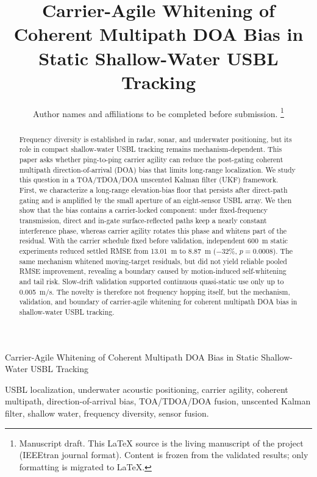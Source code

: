 \documentclass[journal]{IEEEtran}
\begin{document}
\title{Carrier-Agile Whitening of Coherent Multipath DOA Bias in Static Shallow-Water USBL Tracking}

\author{Author names and affiliations to be completed before submission.%
\thanks{Manuscript draft. This LaTeX source is the living manuscript of the project
(IEEEtran journal format). Content is frozen from the validated results; only formatting
is migrated to LaTeX.}}

%
{Carrier-Agile Whitening of Coherent Multipath DOA Bias in Static Shallow-Water USBL Tracking}

\maketitle

\begin{abstract}
Frequency diversity is established in radar, sonar, and underwater positioning, but its role
in compact shallow-water USBL tracking remains mechanism-dependent. This paper asks whether
ping-to-ping carrier agility can reduce the post-gating coherent multipath direction-of-arrival
(DOA) bias that limits long-range localization. We study this question in a TOA/TDOA/DOA
unscented Kalman filter (UKF) framework. First, we characterize a long-range elevation-bias
floor that persists after direct-path gating and is amplified by the small aperture of an
eight-sensor USBL array. We then show that the bias contains a carrier-locked component: under
fixed-frequency transmission, direct and in-gate surface-reflected paths keep a nearly constant
interference phase, whereas carrier agility rotates this phase and whitens part of the residual.
With the carrier schedule fixed before validation, independent 600~m static experiments reduced
settled RMSE from 13.01~m to 8.87~m ($-32\%$, $p=0.0008$). The same mechanism whitened
moving-target residuals, but did not yield reliable pooled RMSE improvement, revealing a
boundary caused by motion-induced self-whitening and tail risk. Slow-drift validation supported
continuous quasi-static use only up to 0.005~m/s. The novelty is therefore not frequency hopping
itself, but the mechanism, validation, and boundary of carrier-agile whitening for coherent
multipath DOA bias in shallow-water USBL tracking.
\end{abstract}

\begin{IEEEkeywords}
USBL localization, underwater acoustic positioning, carrier agility, coherent multipath,
direction-of-arrival bias, TOA/TDOA/DOA fusion, unscented Kalman filter, shallow water,
frequency diversity, sensor fusion.
\end{IEEEkeywords}
\end{document}
